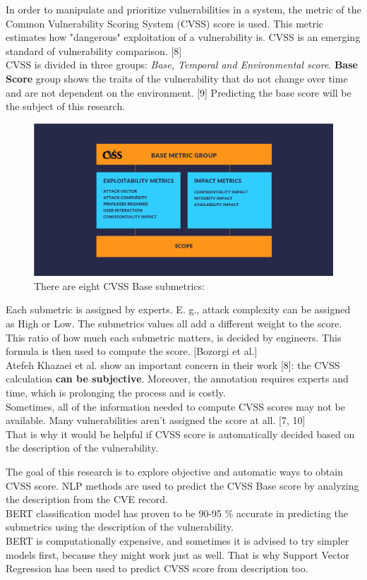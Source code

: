 \documentclass[times, utf8, zavrsni, english]{fer}
\begin{document}
In order to manipulate and prioritize vulnerabilities in a system, the metric of the Common Vulnerability Scoring System (CVSS) score is used. This metric estimates how "dangerous" exploitation of a vulnerability is. CVSS is an emerging standard of vulnerability comparison. [8] \\
CVSS is divided in three groups: \emph{Base, Temporal and Environmental score}. 
\textbf{Base Score} group shows the traits of the vulnerability that do not change over time and are not dependent on the environment. [9] Predicting the base score will be the subject of this research. \\

\begin{figure}[h]
	\caption{There are eight CVSS Base submetrics:}
	\centering
	\includegraphics[scale=0.25]{CVSS-Base-Metric-Group}
\end{figure}
Each submetric is assigned by experts. E. g., attack complexity can be assigned as High or Low. The submetrics values all add a different weight to the score. This ratio of how much each submetric matters, is decided by engineers. This formula is then used to compute the score. [Bozorgi et al.] \\
Atefeh Khazaei et al. show an important concern in their work [8]: the CVSS calculation \textbf{can be subjective}.
Moreover, the annotation requires experts and time, which is prolonging the process and is costly. \\
Sometimes, all of the information needed to compute CVSS scores may not be available. Many vulnerabilities aren't assigned the score at all. [7, 10] \\
That is why it would be helpful if CVSS score is automatically decided based on the description of the vulnerability.

The goal of this research is to explore objective and automatic ways to obtain CVSS score. 
NLP methods are used to predict the CVSS Base score by analyzing the description from the CVE record. \\
BERT classification model has proven to be 90-95 \% accurate in predicting the submetrics using the description of the vulnerability. \\
BERT is computationally expensive, and sometimes it is advised to try simpler models first, because they might work just as well. That is why Support Vector Regression has been used to predict CVSS score from description too.
\end{document}
